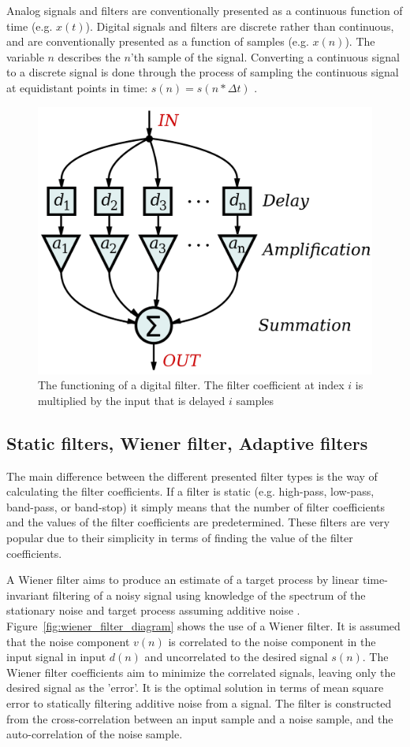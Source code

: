Analog signals and filters are conventionally presented as a continuous function of time (e.g. $x(t)$). Digital signals and filters are discrete rather than continuous, and are conventionally presented as a function of samples (e.g. $x(n)$). The variable $n$ describes the $n$'th sample of the signal. Converting a continuous signal to a discrete signal is done through the process of sampling the continuous signal at equidistant points in time: $s(n)=s(n*\Delta t)$ \cite{linear_systems_and_signals}.

\begin{figure}[h!t]
	\begin{center}
		\includegraphics[width=0.4\columnwidth]{images/wikipedia_fir_digital_filter.png}
	\end{center}
	\caption{The functioning of a digital filter. The filter coefficient at index $i$ is multiplied by the input that is delayed $i$ samples \cite{wikipedia:digital_fir_filter_image}}
	\label{fig:wiki_digital_filter_working}
\end{figure}

\subsection{Static filters, Wiener filter, Adaptive filters}\label{sec:filters_theory}
The main difference between the different presented filter types is the way of calculating the filter coefficients. If a filter is static (e.g. high-pass, low-pass, band-pass, or band-stop) it simply means that the number of filter coefficients and the values of the filter coefficients are predetermined. These filters are very popular due to their simplicity in terms of finding the value of the filter coefficients. 

A Wiener filter aims to produce an estimate of a target process by linear time-invariant filtering of a noisy signal using knowledge of the spectrum of the stationary noise and target process assuming additive noise \cite{wiki:Wiener_filter,lecture_adaptive_filters_1}. Figure~\ref{fig:wiener_filter_diagram} shows the use of a Wiener filter. It is assumed that the noise component $v(n)$ is correlated to the noise component in the input signal in input $d(n)$ and uncorrelated to the desired signal $s(n)$. The Wiener filter coefficients aim to minimize the correlated signals, leaving only the desired signal as the 'error'. It is the optimal solution in terms of mean square error to statically filtering additive noise from a signal. The filter is constructed from the cross-correlation between an input sample and a noise sample, and the auto-correlation of the noise sample.

